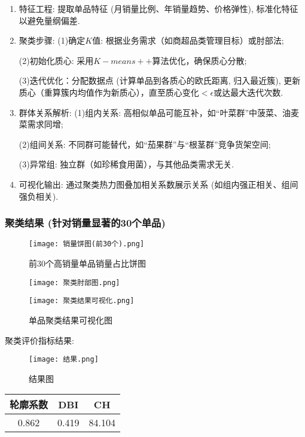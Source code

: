 \documentclass{cumcmthesis}
\begin{document}
\begin{enumerate}
    \item 特征工程: 提取单品特征 (月销量比例、年销量趋势、价格弹性), 标准化特征以避免量纲偏差. 
    \item 聚类步骤: 
    (1)确定$K$值: 根据业务需求（如商超品类管理目标）或肘部法;

    (2)初始化质心: 采用$K-means++$算法优化，确保质心分散; 

    (3)迭代优化：分配数据点 (计算单品到各质心的欧氏距离, 归入最近簇), 更新质心（重算簇内均值作为新质心），直至质心变化$<\epsilon$或达最大迭代次数. 
    
    \item 群体关系解析: 
    (1)组内关系: 高相似单品可能互补，如“叶菜群”中菠菜、油麦菜需求同增; 

    (2)组间关系: 不同群可能替代，如“茄果群”与“根茎群”竞争货架空间; 

    (3)异常组: 独立群（如珍稀食用菌），与其他品类需求无关. 
    \item 可视化输出: 通过聚类热力图叠加相关系数展示关系 (如组内强正相关、组间强负相关). 
\end{enumerate}

\subsubsection{聚类结果 (针对销量显著的30个单品)}

\begin{figure}[H]
    \centering
    \texttt{[image: 销量饼图(前30个).png]} 
    \caption{前30个高销量单品销量占比饼图}
\end{figure}

\begin{figure}[H]
    \centering
    \texttt{[image: 聚类肘部图.png]}
\end{figure}

\begin{figure}[H]
    \centering
    \texttt{[image: 聚类结果可视化.png]}
    \caption{单品聚类结果可视化图}
\end{figure}

聚类评价指标结果:
\begin{figure}[H]
    \centering
    \texttt{[image: 结果.png]}
    \caption{结果图}
\end{figure}

\begin{table}[H]
    \centering
    \begin{tabular}{c c c}
    \toprule
    轮廓系数 & DBI & CH \\
    \midrule
    0.862 & 0.419 & 84.104 \\
    \bottomrule
    \end{tabular}
\end{table}
\end{document}
